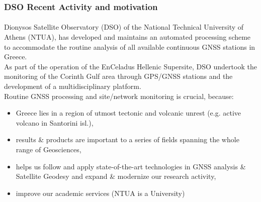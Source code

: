 \begin{frame}\frametitle{DSO Recent Activity and motivation}\framesubtitle{}\label{}
\vskip-1cm
  Dionysos Satellite Observatory (DSO) of the National Technical University of 
  Athens (NTUA), has developed and maintains an automated processing
  scheme to accommodate the routine analysis of all available continuous GNSS 
  stations in Greece.
  \\
 As part of the operation of the EnCeladus Hellenic Supersite,
DSO undertook the monitoring of the Corinth Gulf area through
GPS/GNSS stations and the development of a multidisciplinary
platform.
  \\
  Routine GNSS processing and site/network monitoring is crucial, because:
\begin{itemize}\setlength\itemsep{.5em}
  \item Greece lies in a region of utmost tectonic and volcanic unrest (e.g. 
      active volcano in Santorini isl.),
  \item results \& products are important to a series of fields spanning 
      the whole range of Geosciences,
  \item helps us follow and apply state-of-the-art technologies in GNSS analysis 
      \& Satellite Geodesy and expand \& modernize our research activity,
  \item improve our academic services (NTUA is a University)
\end{itemize}


\end{frame}
%

